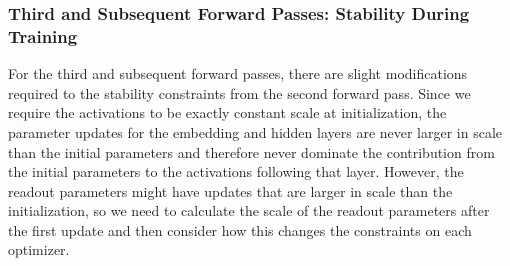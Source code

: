 \documentclass{article}
\theoremstyle{plain}
\theoremstyle{definition}
\theoremstyle{remark}
\begin{document}
\begingroup
\begin{table}[h!]
\renewcommand{\arraystretch}{2.5}
\centering
{}
\end{table}
\endgroup
\FloatBarrier
\subsubsection{Third and Subsequent Forward Passes: Stability During Training}
\label{app:theory_third_forward}
For the third and subsequent forward passes, there are slight modifications required to the stability constraints from the second forward pass. Since we require the activations to be exactly constant scale at initialization, the parameter updates for the embedding and hidden layers are never larger in scale than the initial parameters and therefore never dominate the contribution from the initial parameters to the activations following that layer. However, the readout parameters might have updates that are larger in scale than the initialization, so we need to calculate the scale of the readout parameters after the first update and then consider how this changes the constraints on each optimizer.
\end{document}
